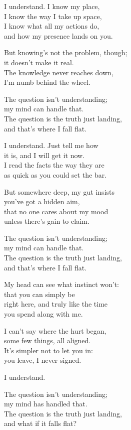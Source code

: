 \begin{lyrics}
I understand. I know my place,\\
I know the way I take up space,\\
I know what all my actions do,\\
and how my presence lands on you.

But knowing's not the problem, though;\\
it doesn't make it real.\\
The knowledge never reaches down,\\
I'm numb behind the wheel.

The question isn't understanding;\\
my mind can handle that.\\
The question is the truth just landing,\\
and that's where I fall flat.

I understand. Just tell me how\\
it is, and I will get it now.\\
I read the facts the way they are\\
as quick as you could set the bar.

But somewhere deep, my gut insists\\
you've got a hidden aim,\\
that no one cares about my mood\\
unless there's gain to claim.

The question isn't understanding;\\
my mind can handle that.\\
The question is the truth just landing,\\
and that's where I fall flat.

My head can see what instinct won't:\\
that you can simply be\\
right here, and truly like the time\\
you spend along with me.

I can't say where the hurt began,\\
some few things, all aligned.\\
It's simpler not to let you in:\\
you leave, I never signed.

I understand.

The question isn't understanding;\\
my mind has handled that.\\
The question is the truth just landing,\\
and what if it falls flat?
\end{lyrics}

